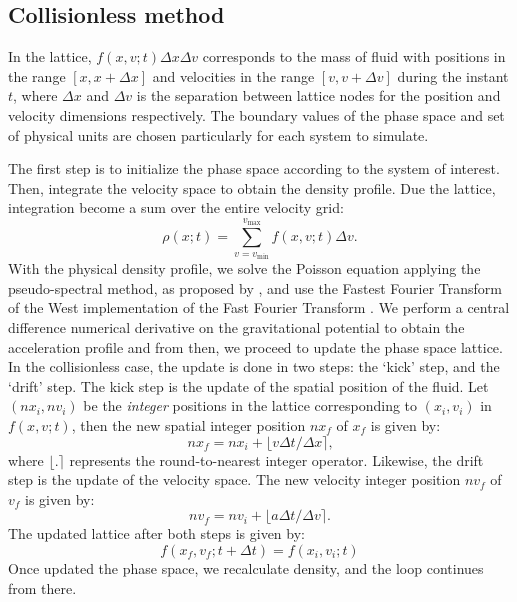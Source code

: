 \documentclass[fleqn,usenatbib]{mnras}
\newcommand{\toInt}[1]{\ensuremath{\lfloor#1\rceil}}
\begin{document}
\subsection{Collisionless method}
\label{sec: streaming}
In the lattice, $f(x,v;t)\Delta x \Delta v$ corresponds to the mass of fluid with positions in the range $[x, x+\Delta x]$ and velocities in the range $[v, v +\Delta v]$ during the instant $t$, where $\Delta x$ and $\Delta v$ is the separation between lattice nodes for the position and velocity dimensions respectively. The boundary values of the phase space and set of physical units are chosen particularly for each system to simulate.

The first step is to initialize the phase space according to the system of interest. 
Then, integrate the velocity space to obtain the density profile. Due the lattice, integration become a sum over the entire velocity grid:%
\begin{equation}
\label{eq: sum_density}
\rho (x;t)= \sum\limits_{v= v_{\text{min}}}^{v_{\text{max}}} f(x,v;t) \Delta v\text{.}
\end{equation}
With the physical density profile, we solve the Poisson equation applying the pseudo-spectral method, as proposed by \citet{2014arXiv1409.8116F}, and use the Fastest Fourier Transform of the West implementation of the Fast Fourier Transform \citep{FFTW}. We perform a central difference numerical derivative on the gravitational potential to obtain the acceleration profile and from then, we proceed to update the phase space lattice. In the collisionless case, the update is done in two steps: the `kick' step, and the `drift' step. 
The kick step is the update of the spatial position of the fluid. Let $(nx_i,nv_i)$ be the \emph{integer} positions in the lattice corresponding to $(x_i,v_i)$ in $f(x,v;t)$, then the new spatial integer position $nx_f$ of $x_f$ is given by:
\begin{equation}
nx_f = nx_i + \toInt{ v \Delta t/ \Delta x}\text{,}
\end{equation}
where $\toInt{.}$ represents the round-to-nearest integer operator. Likewise, the drift step is the update of the velocity space. The new velocity integer position $nv_f$ of $v_f$ is given by:
\begin{equation}
nv_f = nv_i + \toInt{ a \Delta t/ \Delta v}.
\end{equation}
The updated lattice after both steps is given by:
\begin{equation}
f(x_f,v_f;t+\Delta t) = f(x_i,v_i;t) 
\end{equation}
Once updated the phase space, we recalculate density, and the loop continues from there.
\end{document}
